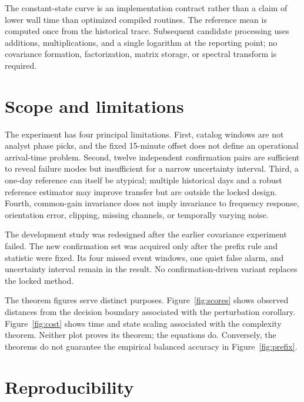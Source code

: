 \documentclass[10pt,letterpaper,twoside]{article}
\begin{document}
The constant-state curve is an implementation contract rather than a claim
of lower wall time than optimized compiled routines.  The reference mean is
computed once from the historical trace.  Subsequent candidate processing
uses additions, multiplications, and a single logarithm at the reporting
point; no covariance formation, factorization, matrix storage, or spectral
transform is required.

\section{Scope and limitations}

The experiment has four principal limitations.  First, catalog windows are
not analyst phase picks, and the fixed 15-minute offset does not define an
operational arrival-time problem.  Second, twelve independent confirmation
pairs are sufficient to reveal failure modes but insufficient for a narrow
uncertainty interval.  Third, a one-day reference can itself be atypical;
multiple historical days and a robust reference estimator may improve
transfer but are outside the locked design.  Fourth, common-gain invariance
does not imply invariance to frequency response, orientation error, clipping,
missing channels, or temporally varying noise.

The development study was redesigned after the earlier covariance experiment
failed.  The new confirmation set was acquired only after the prefix rule and
statistic were fixed.  Its four missed event windows, one quiet false alarm,
and uncertainty interval remain in the result.  No confirmation-driven
variant replaces the locked method.

The theorem figures serve distinct purposes.  Figure~\ref{fig:scores} shows
observed distances from the decision boundary associated with the
perturbation corollary.  Figure~\ref{fig:cost} shows time and state scaling
associated with the complexity theorem.  Neither plot proves its theorem;
the equations do.  Conversely, the theorems do not guarantee the empirical
balanced accuracy in Figure~\ref{fig:prefix}.

\section{Reproducibility}
\end{document}
